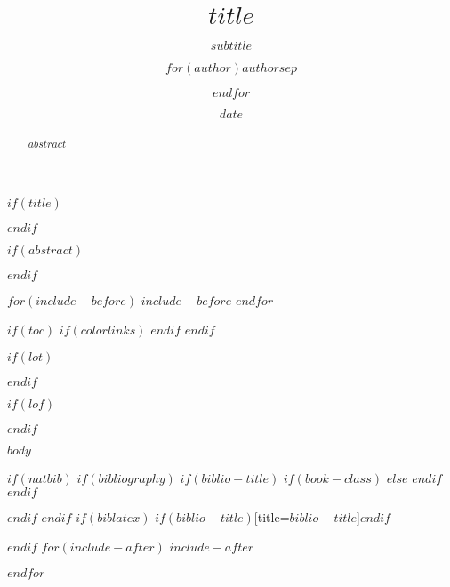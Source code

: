 \documentclass[
$if(DIV)$
  DIV=$DIV$,
$endif$
$if(papersize)$
  $papersize$paper,
$endif$
$if(fontsize)$
  $fontsize$,
$endif$
  headsepline=$if(headsepline)$$headsepline$$else$true$endif$,
  headings=$if(headings)$$headings$$else$standardclasses$endif$,$for(classoption)$$classoption$$sep$,$endfor$
]{scrartcl}
\title{$title$}
\subtitle{$subtitle$}
\author{$for(author)$$author$$sep$ \and $endfor$}
\date{$date$}
\begin{document}
$if(title)$
\maketitle
$endif$

$if(abstract)$
\begin{abstract}
$abstract$
\end{abstract}
$endif$

$for(include-before)$
$include-before$
$endfor$

$if(toc)${
$if(colorlinks)$
\hypersetup{linkcolor=$if(toccolor)$$toccolor$$else$black$endif$}
$endif$
\setcounter{tocdepth}{$toc-depth$}
\tableofcontents
}
$endif$

$if(lot)$
\listoftables
$endif$

$if(lof)$
\listoffigures
$endif$

$body$

$if(natbib)$
$if(bibliography)$
$if(biblio-title)$
$if(book-class)$
\renewcommand\bibname{$biblio-title$}
$else$
\renewcommand\refname{$biblio-title$}
$endif$
$endif$


$endif$
$endif$
$if(biblatex)$
\printbibliography$if(biblio-title)$[title=$biblio-title$]$endif$

$endif$
$for(include-after)$
$include-after$

$endfor$
\end{document}
